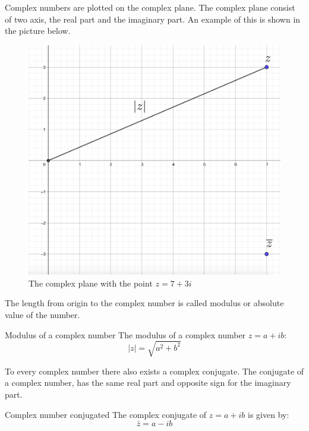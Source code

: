 Complex numbers are plotted on the complex plane. The complex plane consist of two axis, the real part and the imaginary part. An example of this is shown in the picture below.
\begin{figure}[H]
\centering
\includegraphics[scale=0.25]{fig/img/complex_plan}
\caption{The complex plane with the point $z=7+3i$}
\end{figure}
\noindent
The length from origin to the complex number is called modulus or absolute value of the number.
\begin{definition}{Modulus of a complex number}{}
The modulus of a complex number $z=a+ib$:
$$\mid z\mid=\sqrt{a^2+b^2}$$
\end{definition}
\noindent
To every complex number there also exists a complex conjugate. The conjugate of a complex number, has the same real part and opposite sign for the imaginary part.
\begin{definition}{Complex number conjugated}{}
The complex conjugate of $z=a+ib$ is given by:
$$\bar{z}=a-ib$$
\end{definition} 

